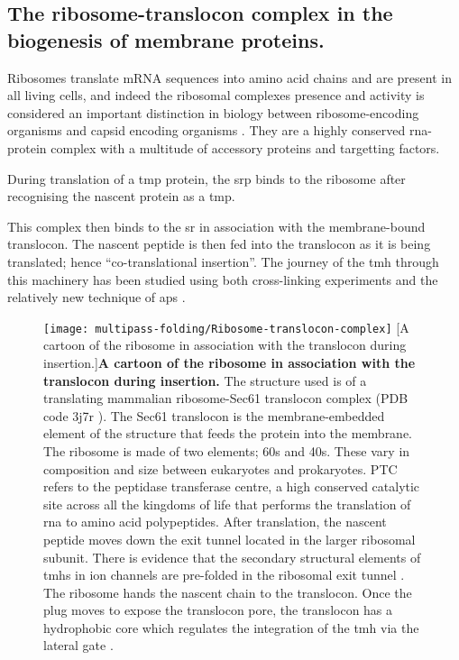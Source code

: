 \subsection{The ribosome-translocon complex in the biogenesis of membrane proteins.}
Ribosomes translate mRNA sequences into amino acid chains and are present in all living cells, and indeed the ribosomal complexes presence and activity is considered an important distinction in biology between ribosome\--encoding organisms and capsid encoding organisms \cite{Raoult2008}.
They are a highly conserved \gls{rna}\--protein complex with a multitude of accessory proteins and targetting factors.

During translation of a \gls{tmp} protein, the \gls{srp} binds to the ribosome after recognising the nascent protein as a \gls{tmp}.

This complex then binds to the \gls{sr} in association with the membrane\--bound translocon.
The nascent peptide is then fed into the translocon as it is being translated; hence ``co-translational insertion''.
The journey of the \gls{tmh} through this machinery has been studied using both  cross\--linking experiments and the relatively new technique of \gls{ap}s \cite{Cymer2015}.

\begin{figure}[!ht]
\centering
\texttt{[image: multipass-folding/Ribosome-translocon-complex]}
        [A cartoon of the ribosome in association with the translocon during insertion.]{\textbf{A cartoon of the ribosome in association with the translocon during insertion.}
        The structure used is of a translating mammalian ribosome-Sec61 translocon complex (PDB code 3j7r \cite{Voorhees2014}).
        The Sec61 translocon is the membrane\--embedded element of the structure that feeds the protein into the membrane.
        The ribosome is made of two elements; 60s and 40s.
        These vary in composition and size between eukaryotes and prokaryotes.
        PTC refers to the peptidase transferase centre, a high conserved catalytic site across all the kingdoms of life that performs the translation of \gls{rna} to amino acid polypeptides.
        After translation, the nascent peptide moves down the exit tunnel located in the larger ribosomal subunit.
        There is evidence that the secondary structural elements of  \gls{tmh}s in ion channels are pre\--folded in the ribosomal exit tunnel \cite{Lu2005, Tu2010a, Tu2014, Kudva2018}.
        The ribosome hands the nascent chain to the translocon.
        Once the plug moves to expose the translocon pore, the translocon has a hydrophobic core which regulates the integration of the \gls{tmh} via the lateral gate \cite{Junne2010}.
}
\label{fig:Ribosome-translocon-complex}
\end{figure}

